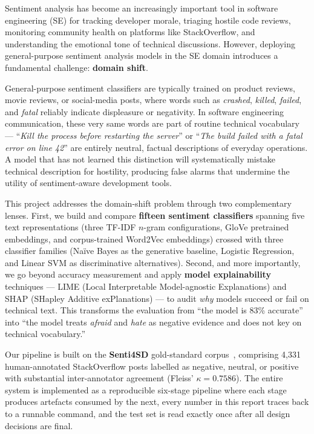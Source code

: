 \documentclass[11pt,a4paper]{article}
\begin{document}
Sentiment analysis has become an increasingly important tool in software engineering (SE) for tracking developer morale, triaging hostile code reviews, monitoring community health on platforms like StackOverflow, and understanding the emotional tone of technical discussions. However, deploying general-purpose sentiment analysis models in the SE domain introduces a fundamental challenge: \textbf{domain shift}.

General-purpose sentiment classifiers are typically trained on product reviews, movie reviews, or social-media posts, where words such as \textit{crashed}, \textit{killed}, \textit{failed}, and \textit{fatal} reliably indicate displeasure or negativity. In software engineering communication, these very same words are part of routine technical vocabulary --- ``\textit{Kill the process before restarting the server}'' or ``\textit{The build failed with a fatal error on line 42}'' are entirely neutral, factual descriptions of everyday operations. A model that has not learned this distinction will systematically mistake technical description for hostility, producing false alarms that undermine the utility of sentiment-aware development tools.

This project addresses the domain-shift problem through two complementary lenses. First, we build and compare \textbf{fifteen sentiment classifiers} spanning five text representations (three TF-IDF $n$-gram configurations, GloVe pretrained embeddings, and corpus-trained Word2Vec embeddings) crossed with three classifier families (Na\"ive Bayes as the generative baseline, Logistic Regression, and Linear SVM as discriminative alternatives). Second, and more importantly, we go beyond accuracy measurement and apply \textbf{model explainability} techniques --- LIME (Local Interpretable Model-agnostic Explanations) and SHAP (SHapley Additive exPlanations) --- to audit \textit{why} models succeed or fail on technical text. This transforms the evaluation from ``the model is 83\% accurate'' into ``the model treats \textit{afraid} and \textit{hate} as negative evidence and does not key on technical vocabulary.''

Our pipeline is built on the \textbf{Senti4SD} gold-standard corpus~\cite{calefato2018sentiment}, comprising 4,331 human-annotated StackOverflow posts labelled as negative, neutral, or positive with substantial inter-annotator agreement (Fleiss' $\kappa = 0.7586$). The entire system is implemented as a reproducible six-stage pipeline where each stage produces artefacts consumed by the next, every number in this report traces back to a runnable command, and the test set is read exactly once after all design decisions are final.
\end{document}
